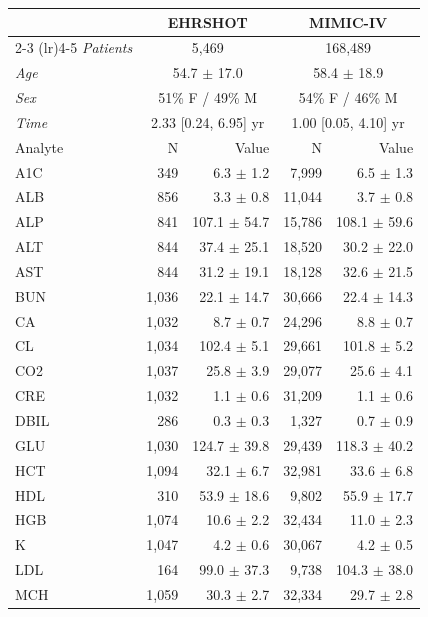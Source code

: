 \begin{table}[ht]
\centering
\scriptsize
\begin{tabular}{lrrrr}
\toprule
  & \multicolumn{2}{c}{EHRSHOT} & \multicolumn{2}{c}{MIMIC-IV} \\
\cmidrule(lr){2-3} \cmidrule(lr){4-5}
\textit{Patients} & \multicolumn{2}{c}{5,469} & \multicolumn{2}{c}{168,489} \\
\textit{Age} & \multicolumn{2}{c}{54.7 $\pm$ 17.0} & \multicolumn{2}{c}{58.4 $\pm$ 18.9} \\
\textit{Sex} & \multicolumn{2}{c}{51\% F / 49\% M} & \multicolumn{2}{c}{54\% F / 46\% M} \\
\textit{Time} & \multicolumn{2}{c}{2.33 [0.24, 6.95] yr} & \multicolumn{2}{c}{1.00 [0.05, 4.10] yr} \\
\midrule
Analyte & N & Value & N & Value \\
\midrule
A1C & 349 & 6.3 $\pm$ 1.2 & 7,999 & 6.5 $\pm$ 1.3 \\
ALB & 856 & 3.3 $\pm$ 0.8 & 11,044 & 3.7 $\pm$ 0.8 \\
ALP & 841 & 107.1 $\pm$ 54.7 & 15,786 & 108.1 $\pm$ 59.6 \\
ALT & 844 & 37.4 $\pm$ 25.1 & 18,520 & 30.2 $\pm$ 22.0 \\
AST & 844 & 31.2 $\pm$ 19.1 & 18,128 & 32.6 $\pm$ 21.5 \\
BUN & 1,036 & 22.1 $\pm$ 14.7 & 30,666 & 22.4 $\pm$ 14.3 \\
CA & 1,032 & 8.7 $\pm$ 0.7 & 24,296 & 8.8 $\pm$ 0.7 \\
CL & 1,034 & 102.4 $\pm$ 5.1 & 29,661 & 101.8 $\pm$ 5.2 \\
CO2 & 1,037 & 25.8 $\pm$ 3.9 & 29,077 & 25.6 $\pm$ 4.1 \\
CRE & 1,032 & 1.1 $\pm$ 0.6 & 31,209 & 1.1 $\pm$ 0.6 \\
DBIL & 286 & 0.3 $\pm$ 0.3 & 1,327 & 0.7 $\pm$ 0.9 \\
GLU & 1,030 & 124.7 $\pm$ 39.8 & 29,439 & 118.3 $\pm$ 40.2 \\
HCT & 1,094 & 32.1 $\pm$ 6.7 & 32,981 & 33.6 $\pm$ 6.8 \\
HDL & 310 & 53.9 $\pm$ 18.6 & 9,802 & 55.9 $\pm$ 17.7 \\
HGB & 1,074 & 10.6 $\pm$ 2.2 & 32,434 & 11.0 $\pm$ 2.3 \\
K & 1,047 & 4.2 $\pm$ 0.6 & 30,067 & 4.2 $\pm$ 0.5 \\
LDL & 164 & 99.0 $\pm$ 37.3 & 9,738 & 104.3 $\pm$ 38.0 \\
MCH & 1,059 & 30.3 $\pm$ 2.7 & 32,334 & 29.7 $\pm$ 2.8 \\

\end{tabular}
\end{table}
